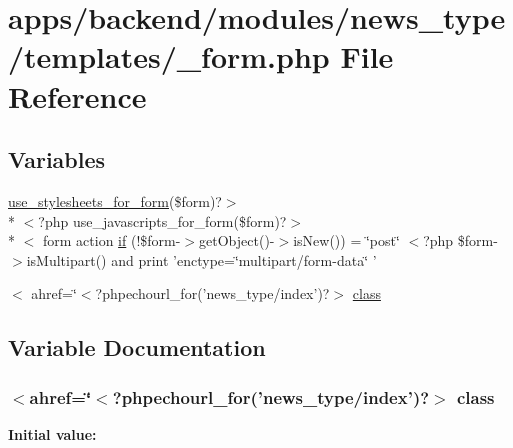 \hypertarget{backend_2modules_2news__type_2templates_2__form_8php}{\section{apps/backend/modules/news\-\_\-type/templates/\-\_\-form.php File Reference}
\label{backend_2modules_2news__type_2templates_2__form_8php}
}
\subsection*{Variables}
\begin{DoxyCompactItemize}
\item 
\hyperlink{live_2modules_2user_2templates_2__form_8php_a86bc4522fdbe625b07bc4a4d6eec3df7}{use\-\_\-stylesheets\-\_\-for\-\_\-form}(\$form)?$>$\\*
$<$?php use\-\_\-javascripts\-\_\-for\-\_\-form(\$form)?$>$\\*
$<$ form action \hyperlink{backend_2modules_2news__type_2templates_2__form_8php_ae30a307b320d8da5d9a945eaf68f7549}{if} (!\$form-\/$>$get\-Object()-\/$>$is\-New()) = \char`\"{}post\char`\"{} $<$?php \$form-\/$>$is\-Multipart() and print 'enctype=\char`\"{}multipart/form-\/data\char`\"{} '
\item 
$<$ ahref=\char`\"{}$<$?phpechourl\-\_\-for('news\-\_\-type/index')?$>$ \hyperlink{backend_2modules_2news__type_2templates_2__form_8php_a7965bba5fbf3bacd0fbae79816f93676}{class}
\end{DoxyCompactItemize}


\subsection{Variable Documentation}
\hypertarget{backend_2modules_2news__type_2templates_2__form_8php_a7965bba5fbf3bacd0fbae79816f93676}{
\subsubsection[{class}]{\setlength{\rightskip}{0pt plus 5cm}$<$ahref=\char`\"{}$<$?phpechourl\-\_\-for('news\-\_\-type/index')?$>$ class}}\label{backend_2modules_2news__type_2templates_2__form_8php_a7965bba5fbf3bacd0fbae79816f93676}
{\bfseries Initial value\-:}


